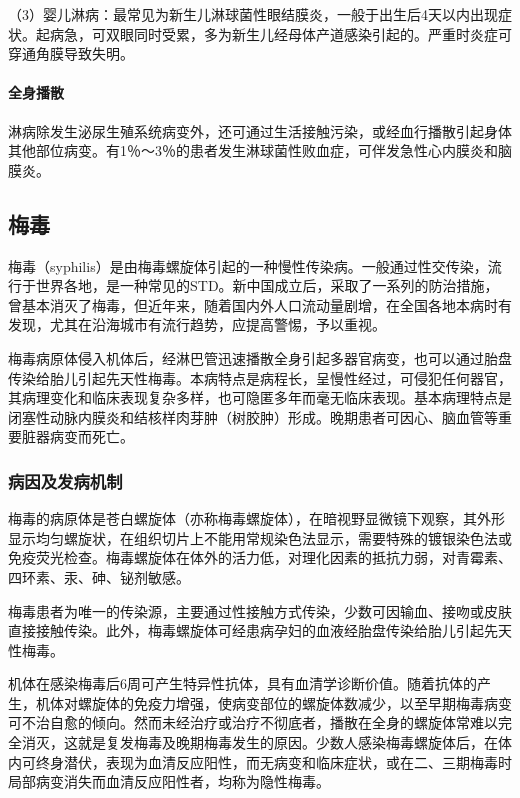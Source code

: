 （3）婴儿淋病：最常见为新生儿淋球菌性眼结膜炎，一般于出生后4天以内出现症状。起病急，可双眼同时受累，多为新生儿经母体产道感染引起的。严重时炎症可穿通角膜导致失明。

\paragraph{全身播散}
淋病除发生泌尿生殖系统病变外，还可通过生活接触污染，或经血行播散引起身体其他部位病变。有1％～3％的患者发生淋球菌性败血症，可伴发急性心内膜炎和脑膜炎。

\subsection{梅毒}

梅毒（syphilis）是由梅毒螺旋体引起的一种慢性传染病。一般通过性交传染，流行于世界各地，是一种常见的STD。新中国成立后，采取了一系列的防治措施，曾基本消灭了梅毒，但近年来，随着国内外人口流动量剧增，在全国各地本病时有发现，尤其在沿海城市有流行趋势，应提高警惕，予以重视。

梅毒病原体侵入机体后，经淋巴管迅速播散全身引起多器官病变，也可以通过胎盘传染给胎儿引起先天性梅毒。本病特点是病程长，呈慢性经过，可侵犯任何器官，其病理变化和临床表现复杂多样，也可隐匿多年而毫无临床表现。基本病理特点是闭塞性动脉内膜炎和结核样肉芽肿（树胶肿）形成。晚期患者可因心、脑血管等重要脏器病变而死亡。

\subsubsection{病因及发病机制}

梅毒的病原体是苍白螺旋体（亦称梅毒螺旋体），在暗视野显微镜下观察，其外形显示均匀螺旋状，在组织切片上不能用常规染色法显示，需要特殊的镀银染色法或免疫荧光检查。梅毒螺旋体在体外的活力低，对理化因素的抵抗力弱，对青霉素、四环素、汞、砷、铋剂敏感。

梅毒患者为唯一的传染源，主要通过性接触方式传染，少数可因输血、接吻或皮肤直接接触传染。此外，梅毒螺旋体可经患病孕妇的血液经胎盘传染给胎儿引起先天性梅毒。

机体在感染梅毒后6周可产生特异性抗体，具有血清学诊断价值。随着抗体的产生，机体对螺旋体的免疫力增强，使病变部位的螺旋体数减少，以至早期梅毒病变可不治自愈的倾向。然而未经治疗或治疗不彻底者，播散在全身的螺旋体常难以完全消灭，这就是复发梅毒及晚期梅毒发生的原因。少数人感染梅毒螺旋体后，在体内可终身潜伏，表现为血清反应阳性，而无病变和临床症状，或在二、三期梅毒时局部病变消失而血清反应阳性者，均称为隐性梅毒。

